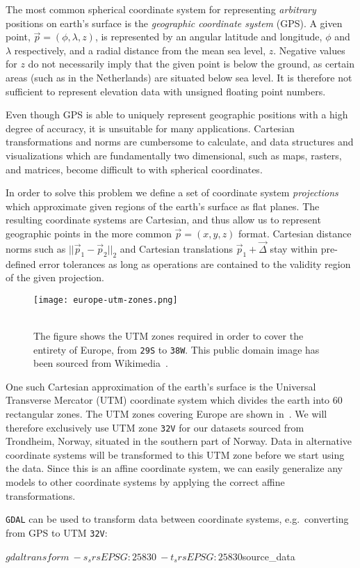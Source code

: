 The most common spherical coordinate system for representing \textit{arbitrary} positions on earth's surface is the \textit{geographic coordinate system} (GPS).
A given point, $\vec{p} = (\phi, \lambda, z)$, is represented by an angular latitude and longitude, $\phi$ and $\lambda$ respectively, and a radial distance from the mean sea level, $z$.
Negative values for $z$ do not necessarily imply that the given point is below the ground, as certain areas (such as in the Netherlands) are situated below sea level.
It is therefore not sufficient to represent elevation data with unsigned floating point numbers.

Even though GPS is able to uniquely represent geographic positions with a high degree of accuracy, it is unsuitable for many applications.
Cartesian transformations and norms are cumbersome to calculate, and data structures and visualizations which are fundamentally two dimensional, such as maps, rasters, and matrices, become difficult to with spherical coordinates.

In order to solve this problem we define a set of coordinate system \textit{projections} which approximate given regions of the earth's surface as flat planes.
The resulting coordinate systems are Cartesian, and thus allow us to represent geographic points in the more common $\vec{p} = (x, y, z)$ format.
Cartesian distance norms such as $||\vec{p}_1 - \vec{p}_2||_2$ and Cartesian translations $\vec{p}_1 + \vec{\Delta}$ stay within pre-defined error tolerances as long as operations are contained to the validity region of the given projection.

\begin{wrapfigure}[15]{r}{0.38\linewidth}
  \vspace{-1em}
  \centering
  \texttt{[image: europe-utm-zones.png]}
  \caption{
    \\
    The figure shows the UTM zones required in order to cover the entirety of Europe, from \texttt{29S} to \texttt{38W}.
    This public domain image has been sourced from Wikimedia~\cite{wiki:europe_utm_zones}.
  }%
  \label{fig:europe-utm-zones}
\end{wrapfigure}

One such Cartesian approximation of the earth's surface is the Universal Transverse Mercator (UTM) coordinate system which divides the earth into 60 rectangular zones. The UTM zones covering Europe are shown in~.
We will therefore exclusively use UTM zone \texttt{32V} for our datasets sourced from Trondheim, Norway, situated in the southern part of Norway.
Data in alternative coordinate systems will be transformed to this UTM zone before we start using the data.
Since this is an affine coordinate system, we can easily generalize any models to other coordinate systems by applying the correct affine transformations.

\texttt{GDAL} can be used to transform data between coordinate systems, e.g.\ converting from GPS to UTM \texttt{32V}:
\begin{shellcode}
$ gdaltransform \
    -s_srs EPSG:25830 \
    -t_srs EPSG:25830 ${source_data}
\end{shellcode}
